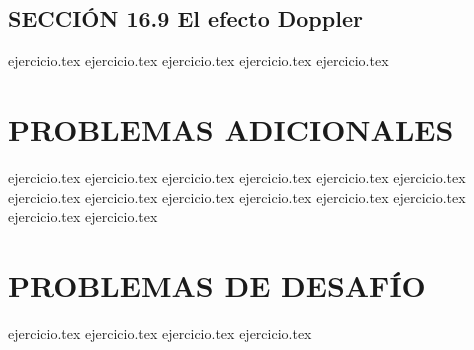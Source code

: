 \subsection*{SECCIÓN 16.9 El efecto Doppler}
\begin{enumerate}
    \setcounter{enumi}{37}
    {ejercicio.tex}
    {ejercicio.tex}
    {ejercicio.tex}
    {ejercicio.tex}
    {ejercicio.tex}
\end{enumerate}

\section*{PROBLEMAS ADICIONALES}
\begin{enumerate}
    \setcounter{enumi}{42}
    {ejercicio.tex}
    {ejercicio.tex}
    {ejercicio.tex}
    {ejercicio.tex}
    {ejercicio.tex}
    {ejercicio.tex}
    {ejercicio.tex}
    {ejercicio.tex}
    {ejercicio.tex}
    {ejercicio.tex}
    {ejercicio.tex}
    {ejercicio.tex}
    {ejercicio.tex}
    {ejercicio.tex}
\end{enumerate}

\section*{PROBLEMAS DE DESAFÍO}
\begin{enumerate}
    \setcounter{enumi}{56}
    {ejercicio.tex}
    {ejercicio.tex}
    {ejercicio.tex}
    {ejercicio.tex}
\end{enumerate}
